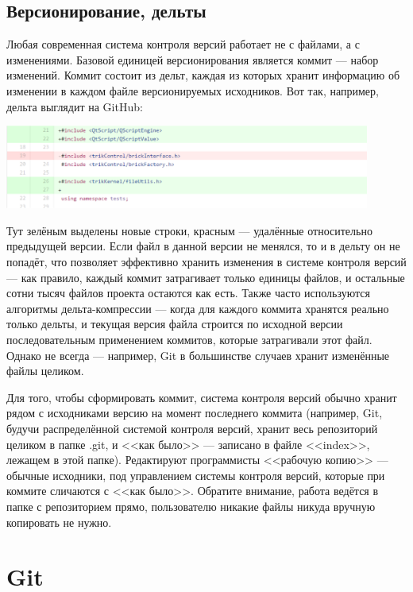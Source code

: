 \documentclass{../../text-style}
\begin{document}
\subsection{Версионирование, дельты}

Любая современная система контроля версий работает не с файлами, а с изменениями. Базовой единицей версионирования является коммит --- набор изменений. Коммит состоит из дельт, каждая из которых хранит информацию об изменении в каждом файле версионируемых исходников. Вот так, например, дельта выглядит на GitHub:

\begin{center}
    \includegraphics[width=0.9\textwidth]{delta.png}
\end{center}

Тут зелёным выделены новые строки, красным --- удалённые относительно предыдущей версии. Если файл в данной версии не менялся, то и в дельту он не попадёт, что позволяет эффективно хранить изменения в системе контроля версий --- как правило, каждый коммит затрагивает только единицы файлов, и остальные сотни тысяч файлов проекта остаются как есть. Также часто используются алгоритмы дельта-компрессии --- когда для каждого коммита хранятся реально только дельты, и текущая версия файла строится по исходной версии последовательным применением коммитов, которые затрагивали этот файл. Однако не всегда --- например, Git в большинстве случаев хранит изменённые файлы целиком.

Для того, чтобы сформировать коммит, система контроля версий обычно хранит рядом с исходниками версию на момент последнего коммита (например, Git, будучи распределённой системой контроля версий, хранит весь репозиторий целиком в папке .git, и <<как было>> --- записано в файле <<index>>, лежащем в этой папке). Редактируют программисты <<рабочую копию>> --- обычные исходники, под управлением системы контроля версий, которые при коммите сличаются с <<как было>>. Обратите внимание, работа ведётся в папке с репозиторием прямо, пользователю никакие файлы никуда вручную копировать не нужно.

\section{Git}
\end{document}
